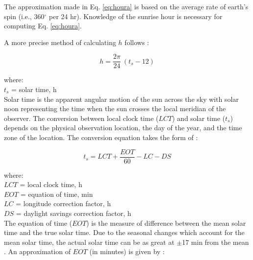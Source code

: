 The approximation made in Eq. \ref{eq:houra} is based on the average rate of earth's spin (i.e., 360$^{\circ}$ per 24 hr). 
Knowledge of the sunrise hour is necessary for computing Eq. \ref{eq:houra}.

A more precise method of calculating $h$ follows \parencite[Eq. 3.1]{stine01}:

\begin{equation}
\label{eq:hour}
    h = \frac{2\pi}{24} \: (t_{s} - 12)
\end{equation}

\noindent where: \\
\indent $t_{s}$ = solar time, h \\

\noindent Solar time is the apparent angular motion of the sun across the sky with solar noon representing the time when the sun crosses the local meridian of the observer. 
The conversion between local clock time ($LCT$) and solar time ($t_{s}$) depends on the physical observation location, the day of the year, and the time zone of the location.  
The conversion equation takes the form of \parencite[Eq. 3.5]{stine01}:

%
\begin{equation}
\label{eq:soltime}
    t_{s} = LCT + \frac{EOT}{60} - LC - DS
\end{equation}

\noindent where: \\
\indent $LCT$ = local clock time, h \\
\indent $EOT$ = equation of time, min \\
\indent $LC$ = longitude correction factor, h \\
\indent $DS$  = daylight savings correction factor, h \\

\noindent The equation of time ($EOT$) is the measure of difference between the mean solar time and the true solar time.  
Due to the seasonal changes which account for the mean solar time, the actual solar time can be as great at $\pm$17 min from the mean \parencite{stine01}.  
An approximation of $EOT$ (in minutes) is given by \parencite[Eq. 1.6]{woolf68}:

